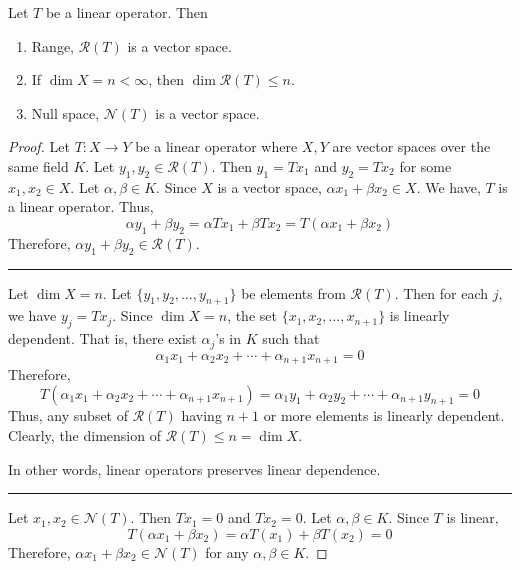 \begin{theorem}
	Let $T$ be a linear operator. Then
	\begin{enumerate}
		\item Range, $\mathscr{R}(T)$ is a vector space.
		\item If $\dim X = n < \infty$, then $\dim \mathscr{R}(T) \le n$.
		\item Null space, $\mathscr{N}(T)$ is a vector space.
	\end{enumerate}
\end{theorem}
\begin{proof}
	Let $T : X \to Y$ be a linear operator where $X,Y$ are vector spaces over the same field $K$.
	Let $y_1,y_2 \in \mathscr{R}(T)$.
	Then $y_1 = Tx_1$ and $y_2 = Tx_2$ for some $x_1,x_2 \in X$.
	Let $\alpha,\beta \in K$.
	Since $X$ is a vector space, $\alpha x_1 + \beta x_2 \in X$.
	We have, $T$ is a linear operator. Thus,
	\[ \alpha y_1 + \beta y_2 = \alpha Tx_1 + \beta Tx_2 = T(\alpha x_1 + \beta x_2) \]
	Therefore, $\alpha y_1 + \beta y_2 \in \mathscr{R}(T)$.\\

	\hrule \vspace{1em}

	Let $\dim X = n$.
	Let $\{ y_1,y_2,\dots,y_{n+1}\}$ be elements from $\mathscr{R}(T)$.
	Then for each $j$, we have $y_j = Tx_j$.
	Since $\dim X = n$, the set $\{x_1,x_2,\dots,x_{n+1}\}$ is linearly dependent.
	That is, there exist $\alpha_j$'s in $K$ such that 
	\[ \alpha_1 x_1 + \alpha_2 x_2 + \dotsb + \alpha_{n+1} x_{n+1} = 0 \]
	Therefore,
	\[ T(\alpha_1 x_1 + \alpha_2 x_2 + \dotsb + \alpha_{n+1} x_{n+1}) = \alpha_1 y_1 + \alpha_2 y_2 + \dotsb + \alpha_{n+1} y_{n+1} = 0 \]
	Thus, any subset of $\mathscr{R}(T)$ having $n+1$ or more elements is linearly dependent.
	Clearly, the dimension of $\mathscr{R}(T) \le n = \dim X$.\\
	\begin{important}
		In other words, linear operators preserves linear dependence.
	\end{important}

	\hrule \vspace{1em}

	Let $x_1,x_2 \in \mathscr{N}(T)$.
	Then $Tx_1 = 0$ and $Tx_2 = 0$.
	Let $\alpha, \beta \in K$.
	Since $T$ is linear,
	\[ T(\alpha x_1 +\beta x_2) = \alpha T(x_1) + \beta T(x_2) = 0 \]
	Therefore, $\alpha x_1 + \beta x_2 \in \mathscr{N}(T)$ for any $\alpha, \beta \in K$.
\end{proof}
